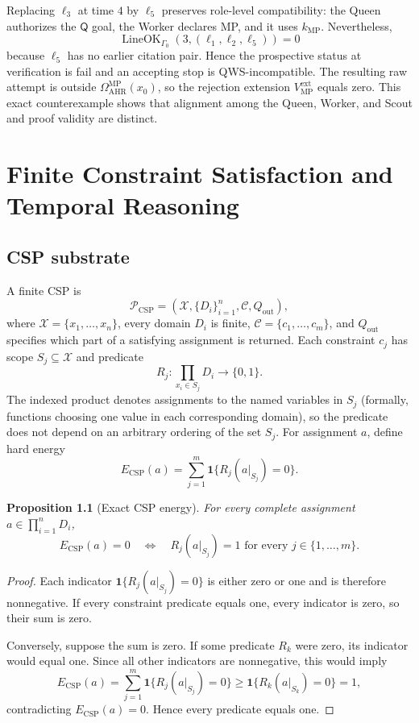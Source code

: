 \documentclass[11pt,oneside]{book}
\newtheorem{proposition}[definition]{Proposition}
\theoremstyle{remark}
\newcommand{\Om}{\Omega}
\newcommand{\one}{\mathbf 1}
\begin{document}
Replacing $\ell_3$ at time $4$ by $\ell_5$ preserves role-level compatibility:
the Queen authorizes the $\mathsf Q$ goal, the Worker declares MP, and it uses
$k_{\mathrm{MP}}$. Nevertheless,
\[
\operatorname{LineOK}_{\Gamma_0}
(3,(\ell_1,\ell_2,\ell_5))=0
\]
because $\ell_5$ has no earlier citation pair. Hence the prospective status
at verification is fail and an accepting stop is QWS-incompatible. The
resulting raw attempt is outside
$\Om_{\mathrm{AHR}}^{\mathrm{MP}}(x_0)$, so the rejection extension
$V_{\mathrm{MP}}^{\mathrm{ext}}$ equals zero. This exact counterexample shows
that alignment among the Queen, Worker, and Scout and proof validity are
distinct.

\chapter{Finite Constraint Satisfaction and Temporal Reasoning}

\section{CSP substrate}

A finite CSP is
\[
\mathcal P_{\mathrm{CSP}}=(\mathcal X,\{D_i\}_{i=1}^n,\mathcal C,Q_{\mathrm{out}}),
\]
where $\mathcal X=\{x_1,\ldots,x_n\}$, every domain $D_i$ is finite,
$\mathcal C=\{c_1,\ldots,c_m\}$, and $Q_{\mathrm{out}}$ specifies which part
of a satisfying assignment is returned. Each constraint $c_j$ has scope
$S_j\subseteq\mathcal X$ and predicate
\[
R_j:\prod_{x_i\in S_j}D_i\to\{0,1\}.
\]
The indexed product denotes assignments to the named variables in $S_j$
(formally, functions choosing one value in each corresponding domain), so
the predicate does not depend on an arbitrary ordering of the set $S_j$.
For assignment $a$, define hard energy
\[
E_{\mathrm{CSP}}(a)=\sum_{j=1}^m\one\{R_j(a|_{S_j})=0\}.
\]

\begin{proposition}[Exact CSP energy]
For every complete assignment
$a\in\prod_{i=1}^nD_i$,
\[
E_{\mathrm{CSP}}(a)=0
\quad\Longleftrightarrow\quad
R_j(a|_{S_j})=1\text{ for every }j\in\{1,\ldots,m\}.
\]
\end{proposition}

\begin{proof}
Each indicator
$\one\{R_j(a|_{S_j})=0\}$ is either zero or one and is therefore
nonnegative. If every constraint predicate equals one, every indicator is
zero, so their sum is zero.

Conversely, suppose the sum is zero. If some predicate $R_k$ were zero, its
indicator would equal one. Since all other indicators are nonnegative, this
would imply
\[
E_{\mathrm{CSP}}(a)
=\sum_{j=1}^m\one\{R_j(a|_{S_j})=0\}
\ge\one\{R_k(a|_{S_k})=0\}=1,
\]
contradicting $E_{\mathrm{CSP}}(a)=0$. Hence every predicate equals one.
\end{proof}
\end{document}
